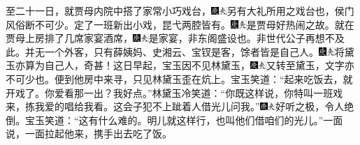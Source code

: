 至二十一日，就贾母内院中搭了家常小巧戏台，{\includegraphics[width=3mm]{../Images/00004}\includegraphics[width=3mm]{../Images/00012}\footnotesize \kaishu 另有大礼所用之戏台也，侯门风俗断不可少。}定了一班新出小戏，昆弋两腔皆有。{\includegraphics[width=3mm]{../Images/00004}\includegraphics[width=3mm]{../Images/00012}\footnotesize \kaishu 是贾母好热闹之故。}就在贾母上房排了几席家宴酒席，{\includegraphics[width=3mm]{../Images/00004}\includegraphics[width=3mm]{../Images/00012}\footnotesize \kaishu 是家宴，非东阁盛设也。非世代公子再想不及此。}并无一个外客，只有薛姨妈、史湘云、宝钗是客，馀者皆是自己人。{\includegraphics[width=3mm]{../Images/00004}\includegraphics[width=3mm]{../Images/00012}\footnotesize \kaishu 将黛玉亦算为自己人，奇甚！}这日早起，宝玉因不见林黛玉，{\includegraphics[width=3mm]{../Images/00004}\includegraphics[width=3mm]{../Images/00012}\footnotesize \kaishu 又转至黛玉，文字亦不可少也。}便到他房中来寻，只见林黛玉歪在炕上。宝玉笑道：“起来吃饭去，就开戏了。你爱看那一出？我好点。”林黛玉冷笑道：“你既这样说，你特叫一班戏来，拣我爱的唱给我看。这会子犯不上跐着人借光儿问我。”{\includegraphics[width=3mm]{../Images/00004}\includegraphics[width=3mm]{../Images/00012}\footnotesize \kaishu 好听之极，令人绝倒。}宝玉笑道：“这有什么难的。明儿就这样行，也叫他们借咱们的光儿。”一面说，一面拉起他来，携手出去吃了饭。

